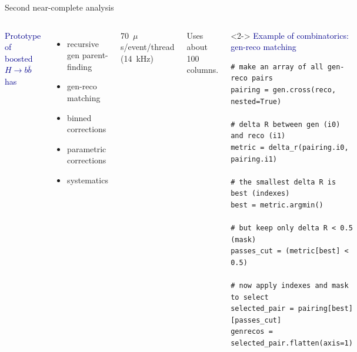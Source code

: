 \documentclass[aspectratio=169]{beamer}
\begin{document}
\begin{frame}[fragile]{Second near-complete analysis}
\vspace{0.5 cm}
\begin{columns}[t]
\textcolor{darkblue}{Prototype of boosted $H \to b\bar{b}$ has}
\begin{itemize}
\item recursive gen parent-finding
\item gen-reco matching
\item binned corrections
\item parametric corrections
\item systematics
\end{itemize}

\large
\vspace{0.25 cm}
70~$\mu$s/event/thread (14~kHz)

\vspace{0.25 cm}
Uses about 100 columns.

\begin{uncoverenv}<2->
\textcolor{darkblue}{\hspace{-0.15 cm}Example of combinatorics: gen-reco matching}

\small
\begin{verbatim}
# make an array of all gen-reco pairs
pairing = gen.cross(reco, nested=True)

# delta R between gen (i0) and reco (i1)
metric = delta_r(pairing.i0, pairing.i1)

# the smallest delta R is best (indexes)
best = metric.argmin()

# but keep only delta R < 0.5 (mask)
passes_cut = (metric[best] < 0.5)

# now apply indexes and mask to select
selected_pair = pairing[best][passes_cut]
genrecos = selected_pair.flatten(axis=1)
\end{verbatim}
\end{uncoverenv}
\end{columns}
\end{frame}
\end{document}
